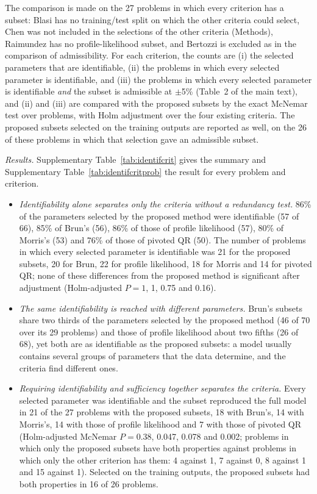 The comparison is made on the 27 problems in which every criterion has a subset: Blasi has no training/test split on which the other criteria could select, Chen was not included in the selections of the other criteria (Methods), Raimundez has no profile-likelihood subset, and Bertozzi is excluded as in the comparison of admissibility. For each criterion, the counts are (i) the selected parameters that are identifiable, (ii) the problems in which every selected parameter is identifiable, and (iii) the problems in which every selected parameter is identifiable \emph{and} the subset is admissible at $\pm$5\% (Table~2 of the main text), and (ii) and (iii) are compared with the proposed subsets by the exact McNemar test over problems, with Holm adjustment over the four existing criteria. The proposed subsets selected on the training outputs are reported as well, on the 26 of these problems in which that selection gave an admissible subset.

\emph{Results.} Supplementary Table~\ref{tab:identifcrit} gives the summary and Supplementary Table~\ref{tab:identifcritprob} the result for every problem and criterion.

\begin{itemize}\itemsep0pt
\item \emph{Identifiability alone separates only the criteria without a redundancy test.} 86\% of the parameters selected by the proposed method were identifiable (57 of 66), 85\% of Brun's (56), 86\% of those of profile likelihood (57), 80\% of Morris's (53) and 76\% of those of pivoted QR (50). The number of problems in which every selected parameter is identifiable was 21 for the proposed subsets, 20 for Brun, 22 for profile likelihood, 18 for Morris and 14 for pivoted QR; none of these differences from the proposed method is significant after adjustment (Holm-adjusted $P=1$, 1, 0.75 and 0.16).
\item \emph{The same identifiability is reached with different parameters.} Brun's subsets share two thirds of the parameters selected by the proposed method (46 of 70 over its 29 problems) and those of profile likelihood about two fifths (26 of 68), yet both are as identifiable as the proposed subsets: a model usually contains several groups of parameters that the data determine, and the criteria find different ones.
\item \emph{Requiring identifiability and sufficiency together separates the criteria.} Every selected parameter was identifiable and the subset reproduced the full model in 21 of the 27 problems with the proposed subsets, 18 with Brun's, 14 with Morris's, 14 with those of profile likelihood and 7 with those of pivoted QR (Holm-adjusted McNemar $P=0.38$, 0.047, 0.078 and 0.002; problems in which only the proposed subsets have both properties against problems in which only the other criterion has them: 4 against 1, 7 against 0, 8 against 1 and 15 against 1). Selected on the training outputs, the proposed subsets had both properties in 16 of 26 problems.
\end{itemize}

